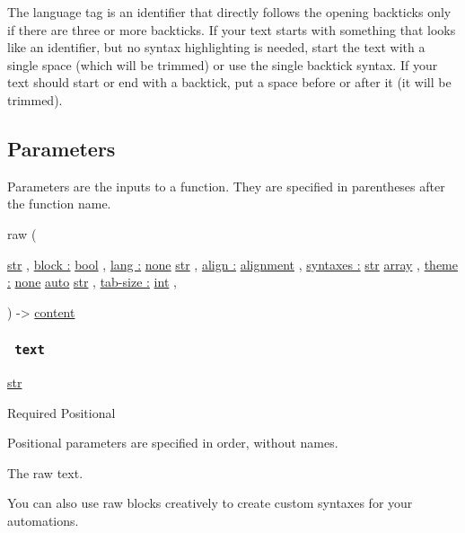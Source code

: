 The language tag is an identifier that directly follows the opening
backticks only if there are three or more backticks. If your text starts
with something that looks like an identifier, but no syntax highlighting
is needed, start the text with a single space (which will be trimmed) or
use the single backtick syntax. If your text should start or end with a
backtick, put a space before or after it (it will be trimmed).

\subsection{\texorpdfstring{{ Parameters
}}{ Parameters }}\label{parameters}

\label{parameters-tooltip}
Parameters are the inputs to a function. They are specified in
parentheses after the function name.

{ raw } (

{ \href{/docs/reference/foundations/str/}{str} , } {
\hyperref[parameters-block]{block :}
\href{/docs/reference/foundations/bool/}{bool} , } {
\hyperref[parameters-lang]{lang :}
\href{/docs/reference/foundations/none/}{none}
\href{/docs/reference/foundations/str/}{str} , } {
\hyperref[parameters-align]{align :}
\href{/docs/reference/layout/alignment/}{alignment} , } {
\hyperref[parameters-syntaxes]{syntaxes :}
\href{/docs/reference/foundations/str/}{str}
\href{/docs/reference/foundations/array/}{array} , } {
\hyperref[parameters-theme]{theme :}
\href{/docs/reference/foundations/none/}{none}
\href{/docs/reference/foundations/auto/}{auto}
\href{/docs/reference/foundations/str/}{str} , } {
\hyperref[parameters-tab-size]{tab-size :}
\href{/docs/reference/foundations/int/}{int} , }

) -\textgreater{} \href{/docs/reference/foundations/content/}{content}

\subsubsection{\texorpdfstring{\texttt{\ text\ }}{ text }}\label{parameters-text}

\href{/docs/reference/foundations/str/}{str}

{Required} {{ Positional }}

\label{parameters-text-positional-tooltip}
Positional parameters are specified in order, without names.

The raw text.

You can also use raw blocks creatively to create custom syntaxes for
your automations.

